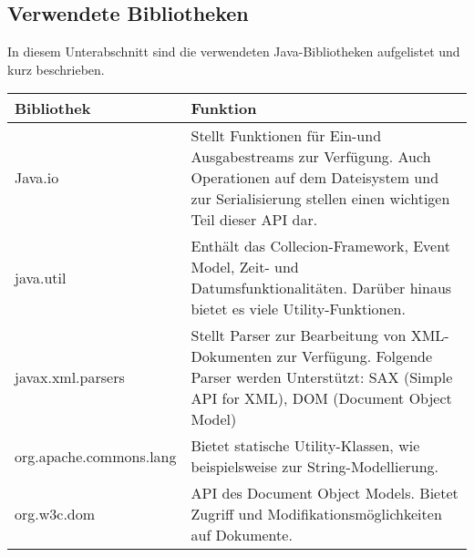 {{{{\subsection{Verwendete Bibliotheken}{
In diesem Unterabschnitt sind die verwendeten Java-Bibliotheken aufgelistet und kurz beschrieben.
\begin{table}[H]
    \begin{tabular}{|p{7cm}|p{7cm}|}
    \hline
    \textbf{Bibliothek}                        & \textbf{Funktion}                                                                                                                                                             \\ \hline
    Java.io                           & Stellt Funktionen für Ein-und Ausgabestreams zur Verfügung. Auch Operationen auf dem Dateisystem und zur Serialisierung stellen einen wichtigen Teil dieser API dar. \\ \hline
    java.util                         & Enthält das Collecion-Framework, Event Model, Zeit- und Datumsfunktionalitäten. Darüber hinaus bietet es viele Utility-Funktionen.                                   \\ \hline
    javax.xml.parsers                 & Stellt Parser zur Bearbeitung von XML-Dokumenten zur Verfügung. Folgende Parser werden Unterstützt: SAX (Simple API for XML), DOM (Document Object Model)         \\ \hline
    org.apache.commons.lang           & Bietet statische Utility-Klassen, wie beispielsweise zur String-Modellierung.                                                                                        \\ \hline
    org.w3c.dom                       & API des Document Object Models. Bietet Zugriff und Modifikationsmöglichkeiten auf Dokumente.                                                                         \\ \hline
    

\end{tabular}
\end{table}}}}}}
